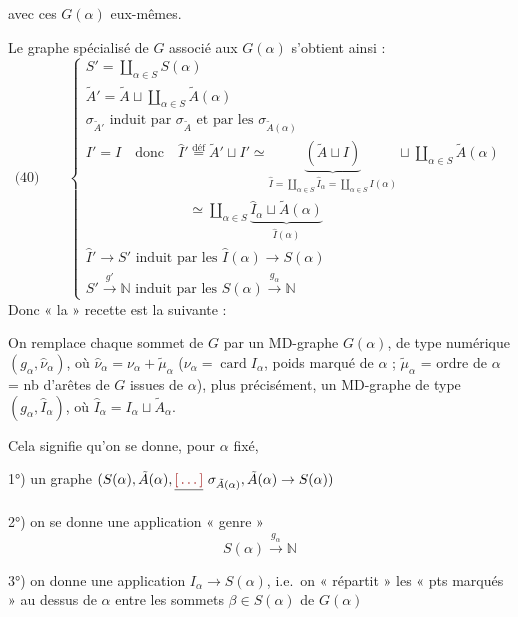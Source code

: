 \documentclass[11pt,a4paper]{article}
\begin{document}
avec ces $G(\alpha)$ eux-mêmes.

Le graphe  spécialisé de $G$ associé aux $G(\alpha)$ s'obtient ainsi :
\[
\text{(40)}\qquad
\left\{
\begin{array}{l}
S' = \coprod_{\alpha\in S} S(\alpha) \\[2pt]
\tilde{A}' = \tilde{A} \sqcup \coprod_{\alpha\in S} \tilde{A}(\alpha) \\[2pt]
\sigma_{\tilde{A}'} \text{ induit par } \sigma_{\tilde{A}} \text{ et par les } \sigma_{\tilde{A}(\alpha)} \\[2pt]
I' = I \quad \text{donc} \quad \hat{I}' \overset{\text{déf}}{=} \tilde{A}' \sqcup I' \simeq \underbrace{(\tilde{A} \sqcup I)}_{\hat{I} = \coprod_{\alpha\in S} \hat{I}_\alpha = \coprod_{\alpha\in S} I(\alpha)} \sqcup \coprod_{\alpha\in S} \tilde{A}(\alpha) \\[2pt]
\phantom{I' = I \quad \text{donc} \quad \hat{I}'} \simeq \coprod_{\alpha\in S} \underbrace{\hat{I}_\alpha \sqcup \tilde{A}(\alpha)}_{\hat{I}(\alpha)} \\[2pt]
\hat{I}' \to S' \text{ induit par les } \hat{I}(\alpha) \to S(\alpha) \\[2pt]
S' \xrightarrow{g'} \mathbb{N} \text{ induit par les } S(\alpha) \xrightarrow{g_\alpha} \mathbb{N}
\end{array}
\right.
\]
Donc « la » recette  est la suivante :

\struck{\ill{}} On remplace chaque sommet  de $G$ par un MD-graphe $G(\alpha)$, de type numérique $(g_\alpha, \hat{\nu}_\alpha)$, où $\hat{\nu}_\alpha = \nu_\alpha + \tilde{\mu}_\alpha$ ($\nu_\alpha = \operatorname{card} I_\alpha$, poids marqué de $\alpha$ ; $\tilde{\mu}_\alpha$ = ordre de $\alpha$ = nb d'arêtes de $G$ issues de $\alpha$), plus précisément, un MD-graphe de type $(g_\alpha, \hat{I}_\alpha)$, où $\hat{I}_\alpha = I_\alpha \sqcup \tilde{A}_\alpha$.

Cela signifie qu'on se donne, pour $\alpha$ fixé,

1°) un graphe  $(S(\alpha), \tilde{A}(\alpha), \struck{\ill{}}\ \sigma_{\tilde{A}(\alpha)}, \tilde{A}(\alpha) \to S(\alpha))$

2°) on \struck{\ill{}} se donne une application « genre »
\[
S(\alpha) \xrightarrow{g_\alpha} \mathbb{N}
\]

3°) on donne une application $I_\alpha \to S(\alpha)$, i.e.\ on « répartit » les \struck{\ill{}} « pts marqués » au dessus de $\alpha$  entre les sommets $\beta \in S(\alpha)$ de $G(\alpha)$
\end{document}
